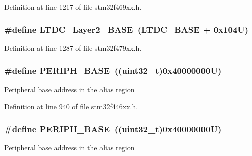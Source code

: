 Definition at line 1217 of file stm32f469xx.\+h.

\subsubsection[{\texorpdfstring{L\+T\+D\+C\+\_\+\+Layer2\+\_\+\+B\+A\+SE}{LTDC_Layer2_BASE}}]{\setlength{\rightskip}{0pt plus 5cm}\#define L\+T\+D\+C\+\_\+\+Layer2\+\_\+\+B\+A\+SE~({\bf L\+T\+D\+C\+\_\+\+B\+A\+SE} + 0x104\+U)}\hypertarget{group___peripheral__memory__map_ga696614b764a3820d9f9560a0eec1e111}{}\label{group___peripheral__memory__map_ga696614b764a3820d9f9560a0eec1e111}


Definition at line 1287 of file stm32f479xx.\+h.

\subsubsection[{\texorpdfstring{P\+E\+R\+I\+P\+H\+\_\+\+B\+A\+SE}{PERIPH_BASE}}]{\setlength{\rightskip}{0pt plus 5cm}\#define P\+E\+R\+I\+P\+H\+\_\+\+B\+A\+SE~((uint32\+\_\+t)0x40000000\+U)}\hypertarget{group___peripheral__memory__map_ga9171f49478fa86d932f89e78e73b88b0}{}\label{group___peripheral__memory__map_ga9171f49478fa86d932f89e78e73b88b0}
Peripheral base address in the alias region 

Definition at line 940 of file stm32f446xx.\+h.

\subsubsection[{\texorpdfstring{P\+E\+R\+I\+P\+H\+\_\+\+B\+A\+SE}{PERIPH_BASE}}]{\setlength{\rightskip}{0pt plus 5cm}\#define P\+E\+R\+I\+P\+H\+\_\+\+B\+A\+SE~((uint32\+\_\+t)0x40000000\+U)}\hypertarget{group___peripheral__memory__map_ga9171f49478fa86d932f89e78e73b88b0}{}\label{group___peripheral__memory__map_ga9171f49478fa86d932f89e78e73b88b0}
Peripheral base address in the alias region 

